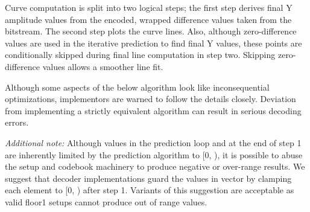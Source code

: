 Curve computation is split into two logical steps; the first step
derives final Y amplitude values from the encoded, wrapped difference
values taken from the bitstream.  The second step plots the curve
lines.  Also, although zero-difference values are used in the
iterative prediction to find final Y values, these points are
conditionally skipped during final line computation in step two.
Skipping zero-difference values allows a smoother line fit.

Although some aspects of the below algorithm look like inconsequential
optimizations, implementors are warned to follow the details closely.
Deviation from implementing a strictly equivalent algorithm can result
in serious decoding errors.

{\em Additional note:} Although  values in
the prediction loop and at the end of step 1 are inherently limited by
the prediction algorithm to [0, \varname{[range]}), it is possible to
  abuse the setup and codebook machinery to produce negative or
  over-range results.  We suggest that decoder implementations guard
  the values in vector  by clamping each
  element to [0, \varname{[range]}) after step 1.  Variants of this
    suggestion are acceptable as valid floor1 setups cannot produce
    out of range values.

